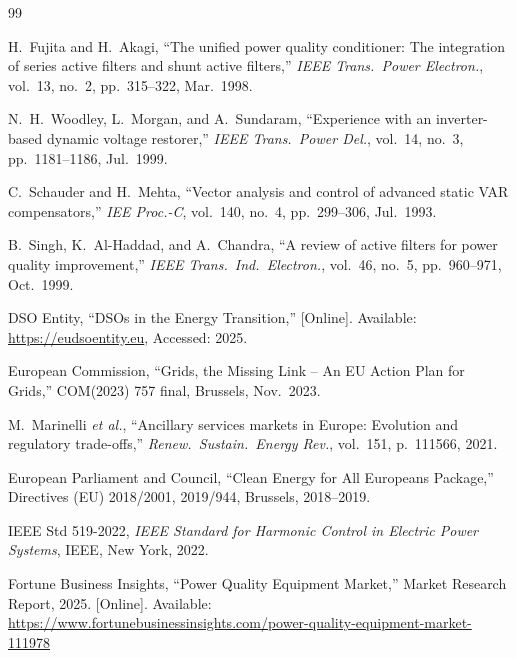 \documentclass[conference]{IEEEtran}
\begin{document}
\begin{thebibliography}{99}

H.~Fujita and H.~Akagi,
``The unified power quality conditioner: The integration of series
active filters and shunt active filters,''
\emph{IEEE Trans.\ Power Electron.}, vol.~13, no.~2,
pp.~315--322, Mar.\ 1998.

N.~H.~Woodley, L.~Morgan, and A.~Sundaram,
``Experience with an inverter-based dynamic voltage restorer,''
\emph{IEEE Trans.\ Power Del.}, vol.~14, no.~3,
pp.~1181--1186, Jul.\ 1999.

C.~Schauder and H.~Mehta,
``Vector analysis and control of advanced static VAR compensators,''
\emph{IEE Proc.-C}, vol.~140, no.~4, pp.~299--306, Jul.\ 1993.

B.~Singh, K.~Al-Haddad, and A.~Chandra,
``A review of active filters for power quality improvement,''
\emph{IEEE Trans.\ Ind.\ Electron.}, vol.~46, no.~5,
pp.~960--971, Oct.\ 1999.

DSO Entity,
``DSOs in the Energy Transition,''
[Online]. Available: \url{https://eudsoentity.eu},
Accessed: 2025.

European Commission,
``Grids, the Missing Link -- An EU Action Plan for Grids,''
COM(2023) 757 final, Brussels, Nov.\ 2023.

M.~Marinelli \emph{et al.},
``Ancillary services markets in Europe: Evolution and regulatory
trade-offs,''
\emph{Renew.\ Sustain.\ Energy Rev.}, vol.~151, p.~111566, 2021.

European Parliament and Council,
``Clean Energy for All Europeans Package,''
Directives (EU) 2018/2001, 2019/944, Brussels, 2018--2019.

IEEE Std 519-2022,
\emph{IEEE Standard for Harmonic Control in Electric Power Systems},
IEEE, New York, 2022.

Fortune Business Insights,
``Power Quality Equipment Market,''
Market Research Report, 2025.
[Online]. Available: \url{https://www.fortunebusinessinsights.com/power-quality-equipment-market-111978}

\end{thebibliography}
\end{document}
